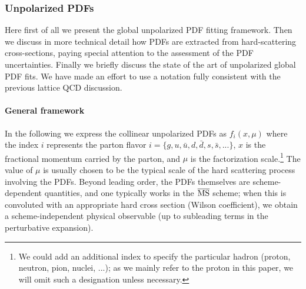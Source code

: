 \subsubsection{Unpolarized PDFs}

Here first of all we present the global unpolarized PDF fitting framework.
%
Then we discuss in more technical detail how PDFs are extracted
from hard-scattering cross-sections, paying special attention
to the assessment of the PDF uncertainties.
%
Finally we briefly discuss the state of the art of unpolarized
global PDF fits.
%
We have made an effort to use a notation fully consistent
with the previous lattice QCD discussion.

\paragraph{General framework}
%
In the following we express the collinear unpolarized PDFs as $f_{i}(x,\mu)$
where the index $i$ represents the parton flavor $i=\{g,u,\bar{u},d,\bar{d},s,\bar{s},...\}$,
$x$ is the fractional momentum carried by the parton, and $\mu$
is the factorization  scale.\footnote{We could add an additional index to specify the particular hadron
(proton, neutron, pion, nuclei, ...); as we mainly refer to the proton
  in this paper, we will omit such a designation unless necessary.}
%
The value of $\mu$ is usually chosen to be the typical scale of the hard scattering
process involving the PDFs.
%
Beyond leading order, the PDFs themselves
are scheme-dependent quantities, and one typically works in
the $\overline{\rm MS}$ scheme; when this is convoluted with an appropriate
hard cross section (Wilson coefficient), we obtain a scheme-independent
physical observable (up to subleading terms in the perturbative expansion). 

